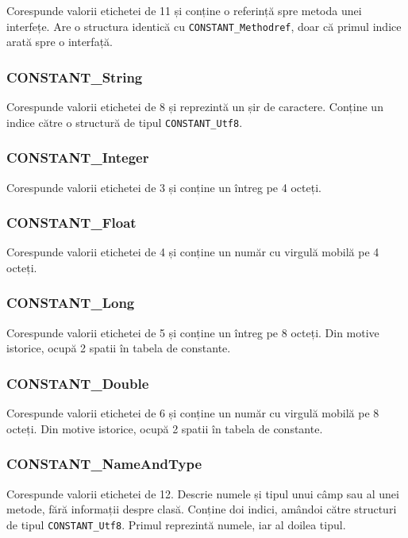 Corespunde valorii etichetei de 11 și conține o referință spre metoda
unei interfețe. Are o structura identică cu
\texttt{CONSTANT\_Methodref}, doar că primul indice arată spre o
interfață.

\subsubsection{CONSTANT\_String}

Corespunde valorii etichetei de 8 și reprezintă un șir de caractere.
Conține un indice către o structură de tipul \texttt{CONSTANT\_Utf8}.

\subsubsection{CONSTANT\_Integer}

Corespunde valorii etichetei de 3 și conține un întreg pe 4 octeți.

\subsubsection{CONSTANT\_Float}

Corespunde valorii etichetei de 4 și conține un număr cu virgulă mobilă
pe 4 octeți.

\subsubsection{CONSTANT\_Long}

Corespunde valorii etichetei de 5 și conține un întreg pe 8 octeți. Din
motive istorice, ocupă 2 spatii în tabela de constante.

\subsubsection{CONSTANT\_Double}

Corespunde valorii etichetei de 6 și conține un număr cu virgulă mobilă
pe 8 octeți. Din motive istorice, ocupă 2 spatii în tabela de constante.

\subsubsection{CONSTANT\_NameAndType}

Corespunde valorii etichetei de 12. Descrie numele și tipul unui câmp
sau al unei metode, fără informații despre clasă. Conține doi indici,
amândoi către structuri de tipul \texttt{CONSTANT\_Utf8}. Primul
reprezintă numele, iar al doilea tipul.

